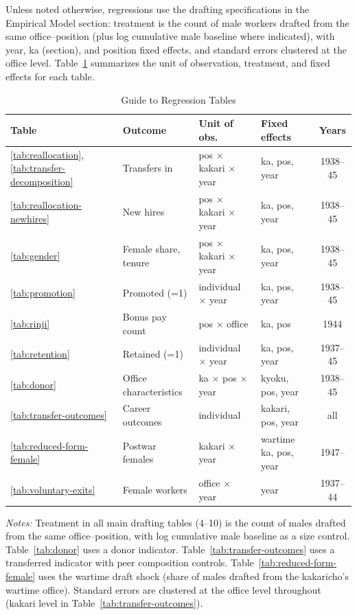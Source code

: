 
Unless noted otherwise, regressions use the drafting specifications in the Empirical Model section: treatment is the count of male workers drafted from the same office--position (plus log cumulative male baseline where indicated), with year, ka (section), and position fixed effects, and standard errors clustered at the office level. Table~\ref{tab:results-map} summarizes the unit of observation, treatment, and fixed effects for each table.

\begin{table}[htbp]
\centering
\caption{Guide to Regression Tables}
\label{tab:results-map}
\small
\begin{tabular}{llllc}
\toprule
Table & Outcome & Unit of obs. & Fixed effects & Years \\
\midrule
\ref{tab:reallocation}, \ref{tab:transfer-decomposition} & Transfers in & pos $\times$ kakari $\times$ year & ka, pos, year & 1938--45 \\
\ref{tab:reallocation-newhires} & New hires & pos $\times$ kakari $\times$ year & ka, pos, year & 1938--45 \\
\ref{tab:gender} & Female share, tenure & pos $\times$ kakari $\times$ year & ka, pos, year & 1938--45 \\
\ref{tab:promotion} & Promoted (=1) & individual $\times$ year & ka, pos, year & 1938--45 \\
\ref{tab:rinji} & Bonus pay count & pos $\times$ office & ka, pos & 1944 \\
\ref{tab:retention} & Retained (=1) & individual $\times$ year & ka, pos, year & 1937--45 \\
\ref{tab:donor} & Office characteristics & ka $\times$ pos $\times$ year & kyoku, pos, year & 1938--45 \\
\ref{tab:transfer-outcomes} & Career outcomes & individual & kakari, pos, year & all \\
\ref{tab:reduced-form-female} & Postwar females & kakari $\times$ year & wartime ka, pos, year & 1947-- \\
\ref{tab:voluntary-exits} & Female workers & office $\times$ year & year & 1937--44 \\
\bottomrule
\end{tabular}
\begin{tablenotes}[flushleft]
\footnotesize
\item \textit{Notes:} Treatment in all main drafting tables (4--10) is the count of males drafted from the same office--position, with log cumulative male baseline as a size control. Table~\ref{tab:donor} uses a donor indicator. Table~\ref{tab:transfer-outcomes} uses a transferred indicator with peer composition controls. Table~\ref{tab:reduced-form-female} uses the wartime draft shock (share of males drafted from the kakaricho's wartime office). Standard errors are clustered at the office level throughout (kakari level in Table~\ref{tab:transfer-outcomes}).
\end{tablenotes}
\end{table}

